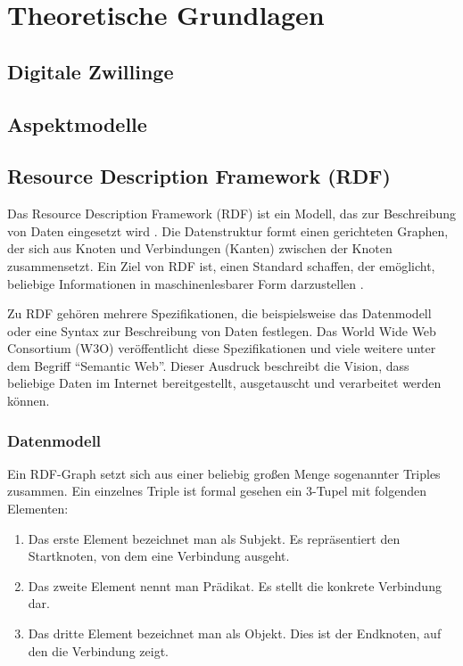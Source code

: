 \chapter{Theoretische Grundlagen}
\fancyhfStyleContent{}


\section{Digitale Zwillinge}
\section{Aspektmodelle}
\section{Resource Description Framework (RDF)}

Das Resource Description Framework (RDF) ist ein Modell, das zur Beschreibung von Daten eingesetzt wird \cite[vgl.][]{w3c2014rdf}. Die Datenstruktur formt einen gerichteten Graphen, der sich aus Knoten und Verbindungen (Kanten) zwischen der Knoten zusammensetzt. Ein Ziel von RDF ist, einen Standard schaffen, der emöglicht, beliebige Informationen in maschinenlesbarer Form darzustellen \cite[vgl.][Sektion 2]{w3c2014rdfprimer}.

Zu RDF gehören mehrere Spezifikationen, die beispielsweise das Datenmodell oder eine Syntax zur Beschreibung von Daten festlegen. Das World Wide Web Consortium (W3O) veröffentlicht diese Spezifikationen und viele weitere unter dem Begriff "`Semantic Web"'. Dieser Ausdruck beschreibt die Vision, dass beliebige Daten im Internet bereitgestellt, ausgetauscht und verarbeitet werden können. \cite[vgl.][]{w3c2014semanticweb}

\subsection{Datenmodell}

Ein RDF-Graph setzt sich aus einer beliebig großen Menge sogenannter Triples zusammen. \cite[vgl.][Sektion 3.1]{w3c2014rdfconcepts} Ein einzelnes Triple ist formal gesehen ein 3-Tupel mit folgenden Elementen:
\begin{enumerate}
	\item Das erste Element bezeichnet man als Subjekt. Es repräsentiert den Startknoten, von dem eine Verbindung ausgeht.
	\item Das zweite Element nennt man Prädikat. Es stellt die konkrete Verbindung dar.
	\item Das dritte Element bezeichnet man als Objekt. Dies ist der Endknoten, auf den die Verbindung zeigt. 
\end{enumerate}

